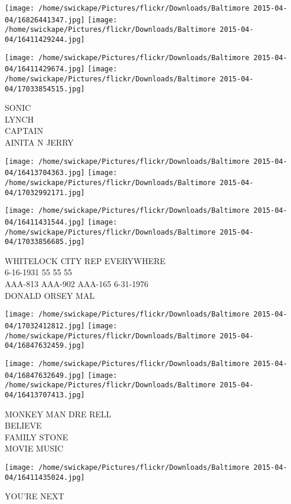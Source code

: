 \documentclass[10pt,letterpaper]{article}
\begin{document}
\texttt{[image: /home/swickape/Pictures/flickr/Downloads/Baltimore 2015-04-04/16826441347.jpg]}
\texttt{[image: /home/swickape/Pictures/flickr/Downloads/Baltimore 2015-04-04/16411429244.jpg]}

\texttt{[image: /home/swickape/Pictures/flickr/Downloads/Baltimore 2015-04-04/16411429674.jpg]}
\texttt{[image: /home/swickape/Pictures/flickr/Downloads/Baltimore 2015-04-04/17033854515.jpg]}

SONIC\\
LYNCH\\
CAPTAIN\\
AINITA N JERRY\\
\pagebreak

\texttt{[image: /home/swickape/Pictures/flickr/Downloads/Baltimore 2015-04-04/16413704363.jpg]}
\texttt{[image: /home/swickape/Pictures/flickr/Downloads/Baltimore 2015-04-04/17032992171.jpg]}

\texttt{[image: /home/swickape/Pictures/flickr/Downloads/Baltimore 2015-04-04/16411431544.jpg]}
\texttt{[image: /home/swickape/Pictures/flickr/Downloads/Baltimore 2015-04-04/17033856685.jpg]}

WHITELOCK CITY REP EVERYWHERE\\
6{-}16{-}1931 55 55 55\\
AAA{-}813 AAA{-}902 AAA{-}165 6{-}31{-}1976\\
DONALD ORSEY MAL\\
\pagebreak

\texttt{[image: /home/swickape/Pictures/flickr/Downloads/Baltimore 2015-04-04/17032412812.jpg]}
\texttt{[image: /home/swickape/Pictures/flickr/Downloads/Baltimore 2015-04-04/16847632459.jpg]}

\texttt{[image: /home/swickape/Pictures/flickr/Downloads/Baltimore 2015-04-04/16847632649.jpg]}
\texttt{[image: /home/swickape/Pictures/flickr/Downloads/Baltimore 2015-04-04/16413707413.jpg]}

MONKEY MAN DRE RELL\\
BELIEVE\\
FAMILY STONE\\
MOVIE MUSIC\\
\pagebreak

\texttt{[image: /home/swickape/Pictures/flickr/Downloads/Baltimore 2015-04-04/16411435024.jpg]}

YOU'RE NEXT\\
\pagebreak
\end{document}
